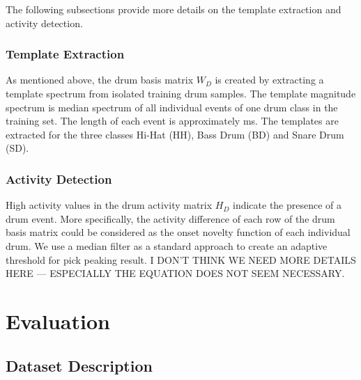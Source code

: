 \documentclass{article}
\begin{document}
The following subsections provide more details on the template extraction and activity detection. 


\subsubsection{Template Extraction}\label{subsubsec:template extraction}
As mentioned above, the drum basis matrix $W_D$ is created by extracting a template spectrum from isolated training drum samples. The template magnitude spectrum is median spectrum of all individual events of one drum class in the training set. The length of each event  is approximately \unit[80]{ms}. The templates are extracted for the three classes Hi-Hat (HH), Bass Drum (BD) and Snare Drum (SD).   

\subsubsection{Activity Detection}\label{subsubsec:activity detection}
High activity values in the drum activity matrix $H_D$ indicate the presence of a drum event. More specifically, the activity difference of each row of the drum basis matrix could be considered as the onset novelty function of each individual drum. We use a median filter as a standard approach to create an adaptive threshold for pick peaking result. I DON'T THINK WE NEED MORE DETAILS HERE --- ESPECIALLY THE EQUATION DOES NOT SEEM NECESSARY.

\section{Evaluation}\label{sec:Evaluation}
\subsection{Dataset Description}\label{subsec:data set description}
\end{document}
